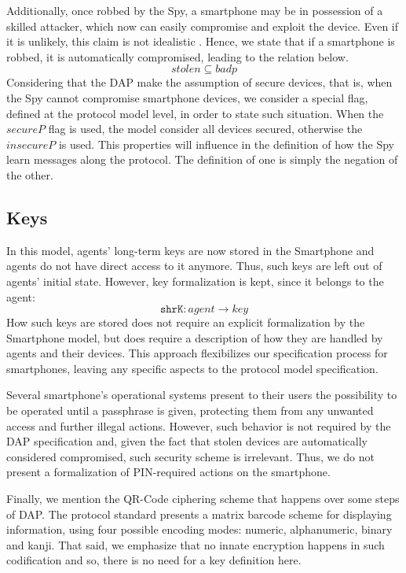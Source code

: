 Additionally, once robbed by the Spy, a smartphone may be in possession of a skilled attacker, which now can easily compromise and exploit the device. Even if it is unlikely, this claim is not idealistic \cite{Rao2015}. Hence, we state that if a smartphone is robbed, it is automatically compromised, leading to the relation below.
%
$$stolen \subseteq badp$$
%
Considering that the DAP make the assumption of secure devices, that is, when the Spy cannot compromise smartphone devices, we consider a special flag, defined at the protocol model level, in order to state such situation. When the \(secureP\) flag is used, the model consider all devices secured, otherwise the \(insecureP\) is used. This properties will influence in the definition of how the Spy learn messages along the protocol. The definition of one is simply the negation of the other.



\subsection{Keys}
In this model, agents' long-term keys are now stored in the Smartphone and agents do not have direct access to it anymore. Thus, such keys are left out of agents' initial state. However, key formalization is kept, since it belongs to the agent:
%
$$\texttt{shrK} : agent \longrightarrow key$$
%
How such keys are stored does not require an explicit formalization by the Smartphone model, but does require a description of how they are handled by agents and their devices. This approach flexibilizes our specification process for smartphones, leaving any specific aspects to the protocol model specification.

Several smartphone's operational systems present to their users the possibility to be operated until a passphrase is given, protecting them from any unwanted access and further illegal actions. However, such behavior is not required by the DAP specification and, given the fact that stolen devices are automatically considered compromised, such security scheme is irrelevant. Thus, we do not present a formalization of PIN-required actions on the smartphone.

Finally, we mention the QR-Code ciphering scheme that happens over some steps of DAP. The protocol standard \cite{ISO13586} presents a matrix barcode scheme for displaying information, using four possible encoding modes: numeric, alphanumeric, binary and kanji. That said, we emphasize that no innate encryption happens in such codification and so, there is no need for a key definition here.



